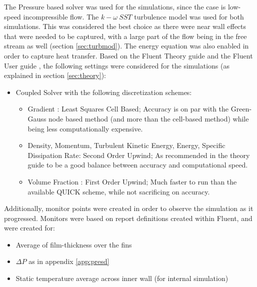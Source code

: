 \documentclass[11pt,a4paper,twoside,oneside]{article}
\begin{document}
The Pressure based solver was used for the simulations, since the case is low-speed incompressible flow. The $k-\omega\ SST$ turbulence model was used for both simulations. This was considered the best choice as there were near wall effects that were needed to be captured, with a large part of the flow being in the free stream as well (section \ref{sec:turbmod}). The energy equation was also enabled in order to capture heat transfer. Based on the Fluent Theory guide and the Fluent User guide \cite{fluth}\cite{flug}, the following settings were considered for the simulations (as explained in section \ref{sec:theory}):
\begin{itemize}
    \item Coupled Solver with the following discretization schemes:
    \begin{itemize}
        \item Gradient : Least Squares Cell Based; Accuracy is on par with the Green-Gauss node based method (and more than the cell-based method) while being less computationally expensive.\cite{fluth}
        \item Density, Momentum, Turbulent Kinetic Energy, Energy, Specific Dissipation Rate: Second Order Upwind; As recommended in the theory guide to be a good balance between accuracy and computational speed\cite{fluth}\cite{flug}.
        \item Volume Fraction : First Order Upwind; Much faster to run than the available QUICK scheme, while not sacrificing on accuracy.
    \end{itemize}
\end{itemize}

 Additionally, monitor points were created in order to observe the simulation as it progressed. Monitors were based on report definitions created within Fluent, and were created for:

\begin{itemize}
    \item Average of film-thickness over the fins
    \item $\Delta P$ as in appendix \ref{app:presd}
    \item Static temperature average across inner wall (for internal simulation)
\end{itemize}
\end{document}
